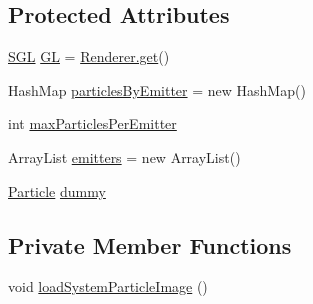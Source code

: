 \subsection*{Protected Attributes}
\begin{DoxyCompactItemize}
\item 
\mbox{\hyperlink{interfaceorg_1_1newdawn_1_1slick_1_1opengl_1_1renderer_1_1_s_g_l}{S\+GL}} \mbox{\hyperlink{classorg_1_1newdawn_1_1slick_1_1particles_1_1_particle_system_a85c7b91571a1ae49fd4887ede1ca318a}{GL}} = \mbox{\hyperlink{classorg_1_1newdawn_1_1slick_1_1opengl_1_1renderer_1_1_renderer_abe742c3a7dfca67c6c01821d27087308}{Renderer.\+get}}()
\item 
Hash\+Map \mbox{\hyperlink{classorg_1_1newdawn_1_1slick_1_1particles_1_1_particle_system_aec10bb63c0065ee17c8d8133936f5db6}{particles\+By\+Emitter}} = new Hash\+Map()
\item 
int \mbox{\hyperlink{classorg_1_1newdawn_1_1slick_1_1particles_1_1_particle_system_a388bac741ed59a82c0f7bbf0fc308673}{max\+Particles\+Per\+Emitter}}
\item 
Array\+List \mbox{\hyperlink{classorg_1_1newdawn_1_1slick_1_1particles_1_1_particle_system_aee956700fc1881201435275fdd6fc32b}{emitters}} = new Array\+List()
\item 
\mbox{\hyperlink{classorg_1_1newdawn_1_1slick_1_1particles_1_1_particle}{Particle}} \mbox{\hyperlink{classorg_1_1newdawn_1_1slick_1_1particles_1_1_particle_system_aa0d598380df6fa8819ea082fef03f3aa}{dummy}}
\end{DoxyCompactItemize}
\subsection*{Private Member Functions}
\begin{DoxyCompactItemize}
\item 
void \mbox{\hyperlink{classorg_1_1newdawn_1_1slick_1_1particles_1_1_particle_system_a9a78c23b6536f783a8d02bee7bf5cd2e}{load\+System\+Particle\+Image}} ()
\end{DoxyCompactItemize}
